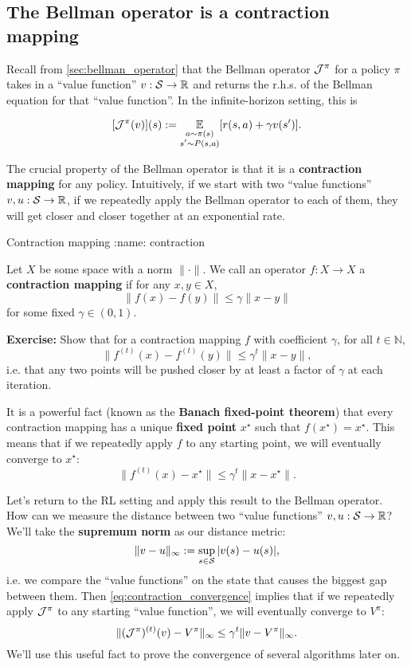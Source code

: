 \documentclass[\main/main]{subfiles}
\begin{document}
\subsection{The Bellman operator is a contraction mapping}

Recall from \ref{sec:bellman_operator} that the Bellman operator $\bop^{\pi}$ for a policy $\pi$ takes in a ``value function'' $v : \S \to \R$ and returns the r.h.s. of the Bellman equation for that ``value function''. In the infinite-horizon setting, this is

\[
    [\bop^{\pi}(v)](s) := \E_{\substack{a \sim \pi(s) \\ s' \sim P(s, a)}} [r(s, a) + \gamma v(s')].
\]

The crucial property of the Bellman operator is that it is a \textbf{contraction mapping} for any policy. Intuitively, if we start with two ``value functions'' $v, u : \S \to \R$, if we repeatedly apply the Bellman operator to each of them, they will get closer and closer together at an exponential rate.

\begin{definition}{Contraction mapping}
:name: contraction

    Let $X$ be some space with a norm $\|\cdot\|$. We call an operator $f: X \to X$ a \textbf{contraction mapping} if for any $x, y \in X$,
    \[
        \|f(x) - f(y)\| \le \gamma \|x - y\|
    \]
    for some fixed $\gamma \in (0, 1)$.
\end{definition}

\textbf{Exercise:} Show that for a contraction mapping $f$ with coefficient $\gamma$, for all $t \in \mathbb{N}$,
\[
    \|f^{(t)}(x) - f^{(t)}(y)\| \le \gamma^t \|x - y\|,
\]
i.e. that any two points will be pushed closer by at least a factor of $\gamma$ at each iteration.

It is a powerful fact (known as the \textbf{Banach fixed-point theorem}) that every contraction mapping has a unique \textbf{fixed point} $x^\star$ such that $f(x^\star) = x^\star$. This means that if we repeatedly apply $f$ to any starting point, we will eventually converge to $x^\star$:
\begin{equation}
    \|f^{(t)}(x) - x^\star\| \le \gamma^t \|x - x^\star\|. \label{eq:contraction_convergence}
\end{equation}

Let's return to the RL setting and apply this result to the Bellman operator. How can we measure the distance between two ``value functions'' $v, u : \S \to \R$? We'll take the \textbf{supremum norm} as our distance metric:
\[
    \| v - u \|_{\infty} := \sup_{s \in \S} |v(s) - u(s)|,
\]
i.e. we compare the ``value functions'' on the state that causes the biggest gap between them.
Then \eqref{eq:contraction_convergence} implies that if we repeatedly apply $\bop^\pi$ to any starting ``value function'', we will eventually converge to $V^\pi$:
\begin{equation}
    \|(\bop^\pi)^{(t)}(v) - V^\pi \|_{\infty} \le \gamma^{t} \| v - V^\pi\|_{\infty}. \label{eq:bellman_convergence}
\end{equation}
We'll use this useful fact to prove the convergence of several algorithms later on.
\end{document}
